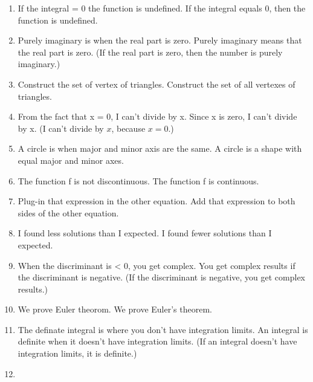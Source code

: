 \documentclass[11pt]{article}
\begin{document}
\begin{enumerate}
\item
If the integral = 0 the function is undefined. \textrightarrow \hspace*{0.25cm} If the integral equals 0, then the function is undefined.
\item
Purely imaginary is when the real part is zero. \textrightarrow \hspace*{0.25cm} Purely imaginary means that the real part is zero. (If the real part is zero, then the number is purely imaginary.)
\item
Construct the set of vertex of triangles. \textrightarrow \hspace*{0.25cm}  Construct the set of all vertexes of triangles.
\item
From the fact that x = 0, I can't divide by x. \textrightarrow \hspace*{0.25cm} Since x is zero, I can’t divide by x. (I can't divide by $x$, because $x=0$.)
\item
A circle is when major and minor axis are the same. \textrightarrow \hspace*{0.25cm} A circle is a shape with equal major and minor axes.
\item
The function f is not discontinuous. \textrightarrow \hspace*{0.25cm} The function f is continuous.
\item
Plug-in that expression in the other equation. \textrightarrow \hspace*{0.25cm} Add that expression to both sides of the other equation.
\item
I found less solutions than I expected. \textrightarrow \hspace*{0.25cm} I found fewer solutions than I expected.
\item
When the discriminant is < 0, you get complex. \textrightarrow \hspace*{0.25cm} You get complex results if the discriminant is negative. (If the discriminant is negative, you get complex results.)
\item
We prove Euler theorom. \textrightarrow \hspace*{0.25cm} We prove Euler's theorem.
\item
The definate integral is where you don't have integration limits. \textrightarrow \hspace*{0.25cm} An integral is definite when it doesn't have integration limits.
(If an integral doesn't have integration limits, it is definite.)
\item

\end{enumerate}
\end{document}
